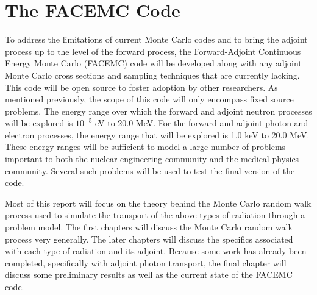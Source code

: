 \section{The FACEMC Code}
\label{sec:research_outline}
To address the limitations of current Monte Carlo codes and to bring the adjoint
process up to the level of the forward process, the Forward-Adjoint Continuous 
Energy Monte Carlo (FACEMC) code will be developed along with any adjoint
Monte Carlo cross sections and sampling techniques that are currently lacking. 
This code will be open source to foster adoption by other researchers. As 
mentioned previously, the scope of this code will only encompass fixed source 
problems. The energy range over which the forward and adjoint neutron processes 
will be explored is $10^{-5}$ eV to 20.0 MeV. For the forward and adjoint photon
and electron processes, the energy range that will be explored is 1.0 keV to 
20.0 MeV. These energy ranges will be sufficient to model a large number of 
problems important to both the nuclear engineering community and the medical 
physics community. Several such problems will be used to test the final version 
of the code. 

Most of this report will focus on the theory behind the Monte Carlo random 
walk process used to simulate the transport of the above types of radiation 
through a problem model. The first chapters will discuss the Monte Carlo random
walk process very generally. The later chapters will discuss the specifics 
associated with each type of radiation and its adjoint. Because some work has 
already been completed, specifically with adjoint photon transport, the final
chapter will discuss some preliminary results as well as the current state of
the FACEMC code.  

